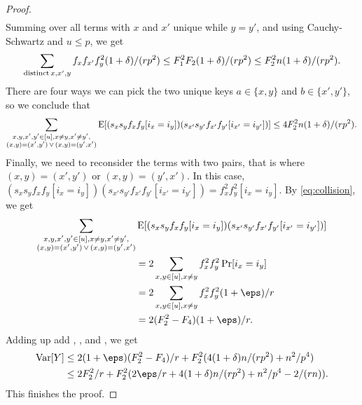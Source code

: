 \begin{proof}
\begin{align*}
    \end{align*}    
    Summing over all terms with $x$ and $x'$ unique while $y=y'$, and
    using Cauchy-Schwartz and $u\leq p$, we get 
    \begin{align*}
        \sum_{{\rm distinct}\,x,x',y} f_xf_{x'}f_y^2 (1 + \delta) /(rp^2) 
            \le F_1^2 F_2 (1 + \delta)/(rp^2)
            \le F_2^2 n(1 + \delta)/(rp^2).
    \end{align*}
    There are four ways we can pick the two unique keys $a\in \{x,y\}$
    and $b\in \{x',y'\}$, so we conclude that
    \begin{equation}\label{eq:one-pair}
        \sum_{\substack{
            x,y,x',y'\in[u], x\neq y, x'\neq y',\\
            (x,y)=(x',y')\,\vee\,(x,y)=(y',x')
        }}
        \operatorname*{E}[(s_x s_y f_x f_y [i_x = i_y]) (s_{x'} s_{y'} f_{x'} f_{y'}[i_{x'} = i_{y'}])]
            \le 4 F_2^2 n(1 + \delta)/(rp^2) .
    \end{equation}
    Finally, we need to reconsider the terms with two pairs, that
    is where $(x,y)=(x',y')$ or $(x,y)=(y',x')$. In
    this case, $(s_x s_y f_x f_y [i_x = i_y]) (s_{x'} s_{y'} f_{x'} f_{y'}[i_{x'} = i_{y'}]) = f_x^2 f_y^2 [i_x = i_y]$.
    By \cref{eq:collision}, we get 
    \begin{equation}\begin{split}    
        \sum_{\substack{
            x,y,x',y'\in[u], x\neq y, x'\neq y',\\
            (x,y)=(x',y')\,\vee\,(x,y)=(y',x')
        }}&
            \E[(s_x s_y f_x f_y [i_x = i_y]) (s_{x'} s_{y'} f_{x'} f_{y'}[i_{x'} = i_{y'}])]
            \\&=2\sum_{x,y\in[u],x\neq y} f_x^2f_y^2 \Pr[i_x=i_y]
            \\&=2\sum_{x,y\in[u],x\neq y} f_x^2f_y^2 (1 + \eps)/r
            \\&=2(F_2^2 - F_4)(1 + \eps)/r .\label{eq:two-pairs}
    \end{split}\end{equation}
    Adding up add , , and
    , we get 
    \begin{align*}
        \Var[Y]
            &\le 2(1 + \eps)(F_2^2 - F_4)/r + F_2^2(4(1 + \delta) n / (rp^2) + n^2/p^4)
            \\&\le 2F_2^2/r + F_2^2 (2\eps/r + 4(1 + \delta)n / (rp^2) + n^2/p^4 - 2 /(rn)) .
    \end{align*}
    This finishes the proof.
\end{proof}


